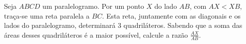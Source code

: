 Seja $ABCD$ um paralelogramo. Por um ponto $X$ do lado $AB$, com $AX < XB$, traça-se uma reta paralela a $BC$. Esta reta, juntamente com as diagonais e os lados do paralelogramo, determinará 3 quadriláteros. Sabendo que a soma das áreas desses quadriláteros é a maior possível, calcule a razão $\frac{AX}{AB}$.
